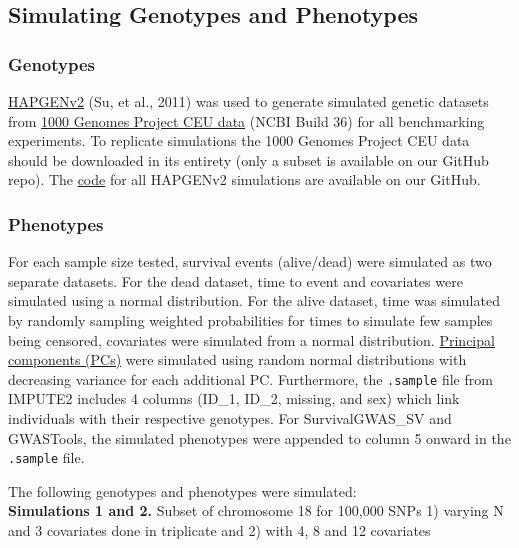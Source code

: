 \documentclass[]{DissertateUSU}
\begin{document}
\subsection{Simulating Genotypes and
Phenotypes}\label{simulating-genotypes-and-phenotypes}

\subsubsection{Genotypes}\label{genotypes}

\href{http://mathgen.stats.ox.ac.uk/genetics_software/hapgen/hapgen2.html}{HAPGENv2}
(Su, et al., 2011) was used to generate simulated genetic datasets from
\href{https://mathgen.stats.ox.ac.uk/impute/impute_v1.html\#Using_IMPUTE_with_the_HapMap_Data}{1000
Genomes Project CEU data} (NCBI Build 36) for all benchmarking
experiments. To replicate simulations the 1000 Genomes Project CEU data
should be downloaded in its entirety (only a subset is available on our
GitHub repo). The
\href{https://github.com/suchestoncampbelllab/gwasurvivr_manuscript/tree/master/hapgen2/code}{code}
for all HAPGENv2 simulations are available on our GitHub.

\subsubsection{Phenotypes}\label{phenotypes}

For each sample size tested, survival events (alive/dead) were simulated
as two separate datasets. For the dead dataset, time to event and
covariates were simulated using a normal distribution. For the alive
dataset, time was simulated by randomly sampling weighted probabilities
for times to simulate few samples being censored, covariates were
simulated from a normal distribution.
\href{https://github.com/suchestoncampbelllab/gwasurvivr_manuscript/blob/master/diff_cov_benchmarks/code/add_pcs_covariates.R}{Principal
components (PCs)} were simulated using random normal distributions with
decreasing variance for each additional PC. Furthermore, the
\texttt{.sample} file from IMPUTE2 includes 4 columns (ID\_1, ID\_2,
missing, and sex) which link individuals with their respective
genotypes. For SurvivalGWAS\_SV and GWASTools, the simulated phenotypes
were appended to column 5 onward in the \texttt{.sample} file.

The following genotypes and phenotypes were simulated:\\
\textbf{Simulations 1 and 2.} Subset of chromosome 18 for 100,000 SNPs
1) varying N and 3 covariates done in triplicate and 2) with 4, 8 and 12
covariates
\end{document}
